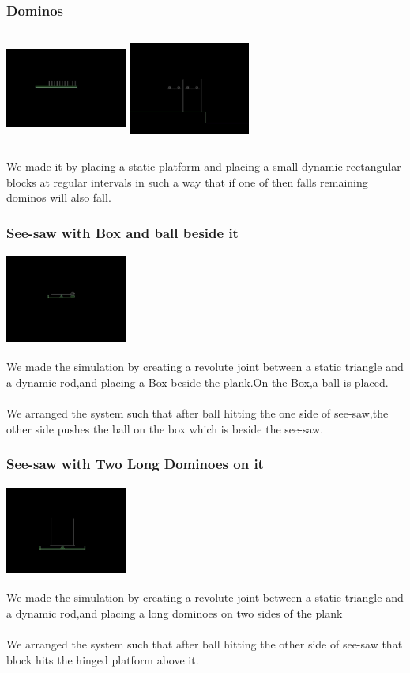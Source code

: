 \documentclass[t,compress,11pt,xcolor=dvipsnames]{beamer}
\begin{document}
\begin{frame}
\frametitle{Dominos}
\begin{columns}[t]
\includegraphics[width=4cm,height=3cm]{dominos}
\includegraphics[width=4cm,height=3cm]{longdominos}
\end{columns}
We made it by placing a static platform and placing a small  dynamic rectangular blocks at regular intervals in such a way that if one of then falls remaining dominos will also fall.
\end{frame}
\begin{frame}
\frametitle{See-saw with Box and ball beside it}
\begin{center}
\includegraphics[width=4cm,height=3cm]{see-saw}
\end{center}
We made the simulation by creating a revolute joint between a static triangle and a dynamic rod,and placing a Box beside the plank.On the Box,a ball is placed.\\~\\
We arranged the system such that after ball hitting the one side of see-saw,the other side 
pushes the ball on the box which is beside the see-saw.
\end{frame}
\begin{frame}
\frametitle{See-saw with Two Long Dominoes on it}
\begin{center}
\includegraphics[width=4cm,height=3cm]{see-saw2}
\end{center}
We made the simulation by creating a revolute joint between a static triangle and a dynamic rod,and placing a long dominoes on two sides of the plank\\~\\
We arranged the system such that after ball hitting the other side of see-saw that block hits the hinged platform above it.
\end{frame}
\end{document}
